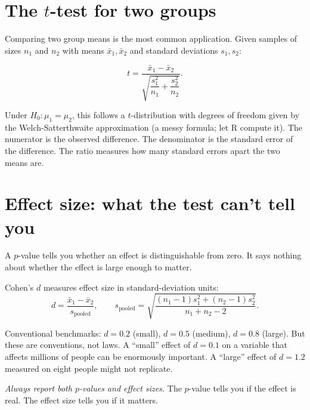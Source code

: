 \section{The $t$-test for two groups}

Comparing two group means is the most common application. Given samples of sizes $n_1$ and $n_2$ with means $\bar{x}_1, \bar{x}_2$ and standard deviations $s_1, s_2$:

\begin{equation}
  t = \frac{\bar{x}_1 - \bar{x}_2}{\sqrt{\dfrac{s_1^2}{n_1} + \dfrac{s_2^2}{n_2}}}.
  \label{eq:two-sample-t}
\end{equation}

Under $H_0\colon \mu_1 = \mu_2$, this follows a $t$-distribution with degrees of freedom given by the Welch-Satterthwaite approximation (a messy formula; let R compute it). The numerator is the observed difference. The denominator is the standard error of the difference. The ratio measures how many standard errors apart the two means are.

\section{Effect size: what the test can't tell you}

A $p$-value tells you whether an effect is distinguishable from zero. It says nothing about whether the effect is large enough to matter.

Cohen's $d$ measures effect size in standard-deviation units:
\begin{equation}
  d = \frac{\bar{x}_1 - \bar{x}_2}{s_{\text{pooled}}}, \qquad s_{\text{pooled}} = \sqrt{\frac{(n_1-1)s_1^2 + (n_2-1)s_2^2}{n_1 + n_2 - 2}}.
  \label{eq:cohens-d}
\end{equation}

Conventional benchmarks: $d = 0.2$ (small), $d = 0.5$ (medium), $d = 0.8$ (large). But these are conventions, not laws. A ``small'' effect of $d = 0.1$ on a variable that affects millions of people can be enormously important. A ``large'' effect of $d = 1.2$ measured on eight people might not replicate.

\emph{Always report both $p$-values and effect sizes.} The $p$-value tells you if the effect is real. The effect size tells you if it matters.


